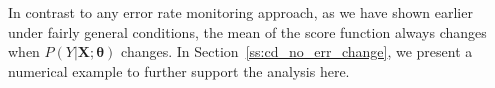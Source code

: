 \documentclass[twoside,11pt]{article}
\begin{document}
In contrast to any error rate monitoring approach, as we have shown earlier under fairly general conditions, the mean of the score function always changes when $P(Y|\bm{X};\bm{\theta})$ changes. In Section~\ref{ss:cd_no_err_change}, we present a numerical example to further support the analysis here.





 
\end{document}
